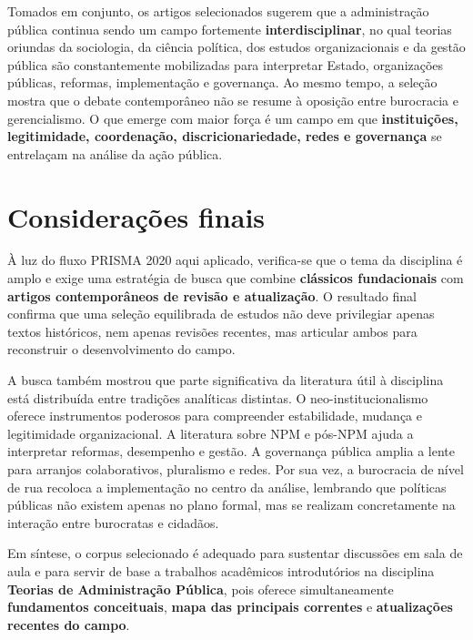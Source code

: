 \documentclass[12pt]{article}
\begin{document}
Tomados em conjunto, os artigos selecionados sugerem que a administração pública continua sendo um campo fortemente \textbf{interdisciplinar}, no qual teorias oriundas da sociologia, da ciência política, dos estudos organizacionais e da gestão pública são constantemente mobilizadas para interpretar Estado, organizações públicas, reformas, implementação e governança. Ao mesmo tempo, a seleção mostra que o debate contemporâneo não se resume à oposição entre burocracia e gerencialismo. O que emerge com maior força é um campo em que \textbf{instituições, legitimidade, coordenação, discricionariedade, redes e governança} se entrelaçam na análise da ação pública.

\section{Considerações finais}
\label{sec:org986e458}

À luz do fluxo PRISMA 2020 aqui aplicado, verifica-se que o tema da disciplina é amplo e exige uma estratégia de busca que combine \textbf{clássicos fundacionais} com \textbf{artigos contemporâneos de revisão e atualização}. O resultado final confirma que uma seleção equilibrada de estudos não deve privilegiar apenas textos históricos, nem apenas revisões recentes, mas articular ambos para reconstruir o desenvolvimento do campo.

A busca também mostrou que parte significativa da literatura útil à disciplina está distribuída entre tradições analíticas distintas. O neo-institucionalismo oferece instrumentos poderosos para compreender estabilidade, mudança e legitimidade organizacional. A literatura sobre NPM e pós-NPM ajuda a interpretar reformas, desempenho e gestão. A governança pública amplia a lente para arranjos colaborativos, pluralismo e redes. Por sua vez, a burocracia de nível de rua recoloca a implementação no centro da análise, lembrando que políticas públicas não existem apenas no plano formal, mas se realizam concretamente na interação entre burocratas e cidadãos.

Em síntese, o corpus selecionado é adequado para sustentar discussões em sala de aula e para servir de base a trabalhos acadêmicos introdutórios na disciplina \textbf{Teorias de Administração Pública}, pois oferece simultaneamente \textbf{fundamentos conceituais}, \textbf{mapa das principais correntes} e \textbf{atualizações recentes do campo}.
\end{document}
